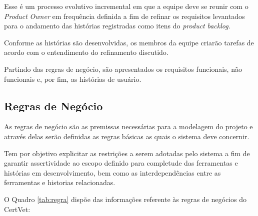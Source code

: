 \documentclass[
    12pt,               %
    openright,          %
    oneside,
    a4paper,            %
    BIBLATEX,           %
    TODO,               %
    english,            %
    brazil              %
    ]{ifsp-spo-inf-ctds}
\begin{document}
        Esse é um processo evolutivo incremental em que a equipe deve se reunir com o \emph{Product} \emph{Owner} em frequência definida a fim de refinar os requisitos levantados para o andamento das histórias registradas como itens do \emph{product} \emph{backlog}. 

        Conforme as histórias são desenvolvidas, os membros da equipe criarão tarefas de acordo com o entendimento do refinamento discutido.

        Partindo das regras de negócio, são apresentados os requisitos funcionais, não funcionais e, por fim, as histórias de usuário.

         \subsection{Regras de Negócio}

            As regras de negócio são as premissas necessárias para a modelagem do projeto e através delas serão definidas as regras básicas as quais o sistema deve concernir.

            Tem por objetivo explicitar as restrições a serem adotadas pelo sistema a fim de garantir assertividade ao escopo definido para completude das ferramentas e histórias em desenvolvimento, bem como as interdependências entre as ferramentas e historias relacionadas.

            O Quadro \ref{tab:regra} dispõe das informações referente às regras de negócios do CertVet:
\end{document}
